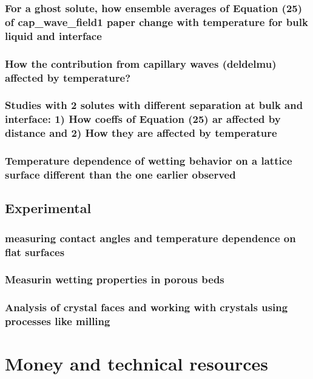 \documentclass[a4paper,12pt,single,pdftex]{article}
\begin{document}
\label{ID_485443609}\subsubsection{For a ghost solute, how ensemble averages of Equation (25) of cap_wave_field1 paper change with temperature for bulk liquid and interface}

\label{ID_577294012}\subsubsection{How the contribution from capillary waves (deldelmu) affected by temperature?}

\label{ID_1474088810}\subsubsection{Studies with 2 solutes with different separation at bulk and interface: 1) How coeffs of Equation (25) ar affected by distance and 2) How they are affected by temperature}

\label{ID_1367637509}\subsubsection{Temperature dependence of wetting behavior on a lattice surface different than the one earlier observed}

\label{ID_1178677590}\subsection{Experimental}

\label{ID_1995511474}\subsubsection{measuring contact angles and temperature dependence on flat surfaces}

\label{ID_853592622}\subsubsection{Measurin wetting properties in porous beds}

\label{ID_1635488399}\subsubsection{Analysis of crystal faces and working with crystals using processes like milling}

\label{ID_1082352398}\section{Money and technical resources}


\newpage
\end{document}
